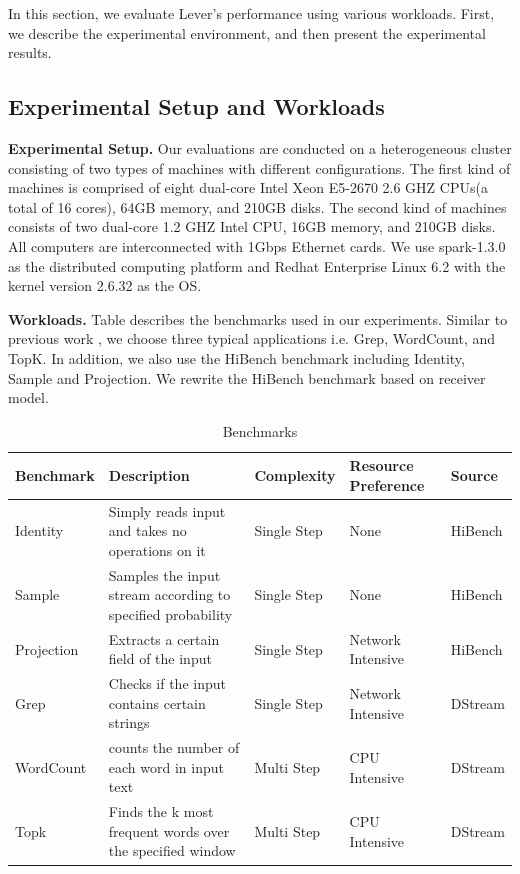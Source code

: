 \documentclass[10pt,conference,compsocconf,letterpaper]{IEEEtran}
\begin{document}
  In this section, we evaluate Lever's performance using various workloads. First, we describe the experimental environment, and then present the experimental results.

\subsection{Experimental Setup and Workloads}

  \textbf{Experimental Setup.} Our evaluations are conducted on a heterogeneous cluster consisting of two types of machines with different configurations. The first kind of machines is comprised of eight dual-core Intel Xeon E5-2670 2.6 GHZ CPUs(a total of 16 cores), 64GB memory, and 210GB disks. The second kind of machines consists of two dual-core 1.2 GHZ Intel CPU, 16GB memory, and 210GB disks. All computers are interconnected with 1Gbps Ethernet cards. We use spark-1.3.0 as the distributed computing platform and Redhat Enterprise Linux 6.2 with the kernel version 2.6.32 as the OS.

  \textbf{Workloads.} Table \uppercase\expandafter{} describes the benchmarks used in our experiments. Similar to previous work \cite{Zaharia2013}, we choose three typical applications i.e. Grep, WordCount, and TopK. In addition, we also use the HiBench \cite{HiBench} benchmark including Identity, Sample and Projection. We rewrite the HiBench \cite{HiBench} benchmark based on receiver model.
  \begin{table}[htbp]
    \footnotesize
    \centering
    \caption{Benchmarks}
    \begin{threeparttable}
    \centering
      \begin{tabular}{|p{1.4cm}|p{7.2cm}|p{1.5cm}|p{2.8cm}|p{1.7cm}|}
        \hline
        \centering
        \textbf{Benchmark} & \textbf{Description} & \textbf{Complexity} & \textbf{Resource Preference} & \textbf{Source} \\
        \hline
        Identity & Simply reads input and takes no operations on it & Single Step & None & HiBench \cite{HiBench} \\
        \hline
        Sample & Samples the input stream according to specified probability & Single Step & None & HiBench \cite{HiBench} \\
        \hline
        Projection & Extracts a certain field of the input & Single Step & Network Intensive & HiBench \cite{HiBench} \\
        \hline
        Grep & Checks if the input contains certain strings & Single Step & Network Intensive & DStream \cite{Zaharia2013} \\
        \hline
        WordCount & counts the number of each word in input text & Multi Step & CPU Intensive & DStream \cite{Zaharia2013} \\
        \hline
        Topk & Finds the k most frequent words over the specified window & Multi Step & CPU Intensive & DStream \cite{Zaharia2013} \\
        \hline
      \end{tabular}
    \end{threeparttable}
    \label{Table2}
  \end{table}
\end{document}
